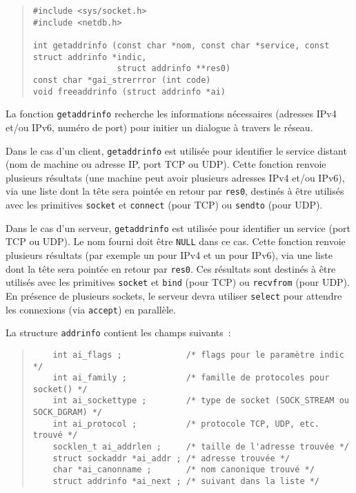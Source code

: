 \documentclass [twoside] {report}
\begin{document}
\begin {quote}
\begin {verbatim}
#include <sys/socket.h>
#include <netdb.h>

int getaddrinfo (const char *nom, const char *service, const struct addrinfo *indic,
                 struct addrinfo **res0)
const char *gai_strerrror (int code)
void freeaddrinfo (struct addrinfo *ai)
\end{verbatim}
\end {quote}

La fonction \texttt {getaddrinfo} recherche les informations
nécessaires (adresses IPv4 et/ou IPv6, numéro de port) pour initier
un dialogue à travers le réseau.

Dans le cas d'un client, \texttt {getaddrinfo} est utilisée pour
identifier le service distant (nom de machine ou adresse IP, port
TCP ou UDP).  Cette fonction renvoie plusieurs résultats (une machine
peut avoir plusieurs adresses IPv4 et/ou IPv6), via une liste dont
la tête sera pointée en retour par \texttt {res0}, destinés à être
utilisés avec les primitives \texttt {socket} et \texttt {connect}
(pour TCP) ou \texttt {sendto} (pour UDP).

Dans le cas d'un serveur, \texttt {getaddrinfo} est utilisée pour
identifier un service (port TCP ou UDP). Le nom fourni doit être
\texttt {NULL} dans ce cas. Cette fonction renvoie plusieurs résultats
(par exemple un pour IPv4 et un pour IPv6), via une liste dont la
tête sera pointée en retour par \texttt {res0}. Ces résultats sont
destinés à être utilisés avec les primitives \texttt {socket} et
\texttt {bind} (pour TCP) ou \texttt {recvfrom} (pour UDP). En
présence de plusieurs sockets, le serveur devra utiliser \texttt
{select} pour attendre les connexions (via \texttt {accept}) en
parallèle.

La structure \texttt {addrinfo} contient les champs suivants~:

\begin {quote}
    \small
\begin {verbatim}
    int ai_flags ;             /* flags pour le paramètre indic */
    int ai_family ;            /* famille de protocoles pour socket() */
    int ai_sockettype ;        /* type de socket (SOCK_STREAM ou SOCK_DGRAM) */
    int ai_protocol ;          /* protocole TCP, UDP, etc. trouvé */
    socklen_t ai_addrlen ;     /* taille de l'adresse trouvée */
    struct sockaddr *ai_addr ; /* adresse trouvée */
    char *ai_canonname ;       /* nom canonique trouvé */
    struct addrinfo *ai_next ; /* suivant dans la liste */
\end{verbatim}
\end {quote}
\end{document}
